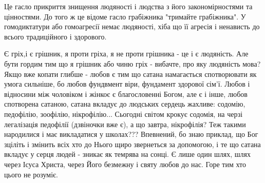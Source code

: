 \begin{itemize}
Це гасло прикриття знищення людяності і людства з його закономірностями та
цінностями. До того ж це відоме гасло грабіжника "тримайте грабіжника". У
гомодиктатури або гомоагресії немає людяності, хіба що її агресія і ненависть
до всього традиційного і здорового.


Є гріх,і є грішник, я проти гріха, я не проти грішника - це і є людяність. Але
бути гордим тим що я грішник або чиню гріх - вибачте, про яку людяність мова?
Якщо вже копати глибше - любов є тим що сатана намагається спотворювати як
умога сильніше, бо любов фундвмент віри, фундамент здорової сім’ї. Любов і
відносини між чоловіком і жінкоє є благословенні Богом, але є і інше, любов
спотворена сатаною, сатана вкладує до людських сердець жахливе: содомію,
педофілію, зоофілію, нікрофілію... Сьогодні світом крокує содомія, на черзі
легалізація педофілії (дзвіночки вже є), а що завтра, нікрофілія? Теж такими
народилися і має викладатися у школах??? Впевнений, бо знаю приклад, що Бог
зціліть і змінить всіх хто до Нього щиро звернеться за допомогою, і те що
сатана вкладує у серця людей - зникає як темрява на сонці. Є лише один шлях,
шлях через Ісуса Христа, через Його безмежну і святу любов до нас. Горе тим хто
цього не розуміє.

\end{itemize} %


